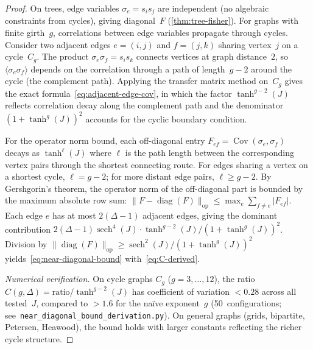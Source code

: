 \documentclass[11pt]{article}
\theoremstyle{definition}
\theoremstyle{remark}
\begin{document}
\begin{proof}
On trees, edge variables $\sigma_e = s_i s_j$ are independent
(no algebraic constraints from cycles), giving diagonal~$F$
(\cref{thm:tree-fisher}).
For graphs with finite girth~$g$, correlations between edge variables
propagate through cycles. Consider two adjacent
edges $e = (i,j)$ and $f = (j,k)$ sharing vertex~$j$ on a
cycle~$C_g$. The product $\sigma_e \sigma_f = s_i s_k$ connects
vertices at graph distance~$2$, so
$\langle \sigma_e \sigma_f \rangle$ depends on the correlation through
a path of length~$g - 2$ around the cycle (the complement path).
Applying the transfer matrix method on~$C_g$ gives the exact
formula~\eqref{eq:adjacent-edge-cov}, in which the factor
$\tanh^{g-2}(J)$ reflects correlation decay along the complement path
and the denominator $(1 + \tanh^g(J))^2$ accounts for the cyclic
boundary condition.

For the operator norm bound, each off-diagonal entry
$F_{ef} = \operatorname{Cov}(\sigma_e, \sigma_f)$ decays as
$\tanh^{\ell}(J)$ where $\ell$ is the path length between the
corresponding vertex pairs through the shortest connecting route.
For edges sharing a vertex on a shortest cycle, $\ell = g - 2$;
for more distant edge pairs, $\ell \geq g - 2$.
By Gershgorin's theorem, the operator norm of the off-diagonal part
is bounded by the maximum absolute row sum:
$\|F - \operatorname{diag}(F)\|_{\text{op}} \leq
\max_e \sum_{f \neq e} |F_{ef}|$.
Each edge $e$ has at most $2(\Delta - 1)$ adjacent edges, giving
the dominant contribution $2(\Delta - 1) \operatorname{sech}^4(J)
\cdot \tanh^{g-2}(J) / (1 + \tanh^g(J))^2$.
Division by $\|\operatorname{diag}(F)\|_{\text{op}}
\geq \operatorname{sech}^2(J) / (1 + \tanh^g(J))^2$
yields~\eqref{eq:near-diagonal-bound} with~\eqref{eq:C-derived}.

\textit{Numerical verification.}
On cycle graphs $C_g$ ($g = 3, \ldots, 12$), the ratio
$C(g,\Delta) = \text{ratio}/\tanh^{g-2}(J)$ has coefficient of
variation $< 0.28$ across all tested~$J$, compared to $> 1.6$ for
the na\"ive exponent~$g$
(50~configurations; see~\texttt{near\_diagonal\_bound\_derivation.py}).
On general graphs (grids, bipartite, Petersen, Heawood), the bound
holds with larger constants reflecting the richer cycle structure.
\end{proof}
\end{document}
